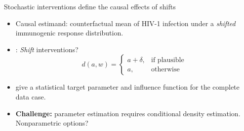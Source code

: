 \documentclass{beamer}
\begin{document}
\begin{frame}[c]{Stochastic interventions define the causal effects of shifts}

\begin{center}
\begin{itemize}
  \itemsep10pt
  \item Causal estimand: counterfactual mean of HIV-1 infection under a
    \textit{shifted} immunogenic response distribution.
  \item \cite{diaz2012population, diaz2018stochastic}: \textit{Shift}
    interventions?
     \begin{equation*}\label{shift_intervention}
       d(a, w) =
         \begin{cases}
           a + \delta, & \text{if plausible} \\
           a, & \text{otherwise}
         \end{cases}
     \end{equation*}
  \item \cite{diaz2012population, diaz2018stochastic} give a statistical target
    parameter and influence function for the complete data case.
  \item \textbf{Challenge:} parameter estimation requires conditional density
    estimation. Nonparametric options?
\end{itemize}
\end{center}


\end{frame}

\end{document}

